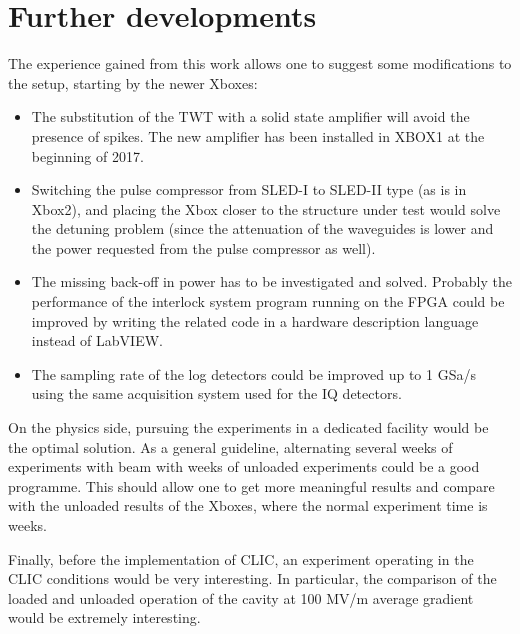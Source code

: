 \section[Further developments]{Further developments}

The experience gained from this work allows one to suggest some modifications to the setup, starting by the newer Xboxes:
\begin{itemize}
\item The substitution of the TWT with a solid state amplifier will avoid the presence of spikes. The new amplifier has been installed in XBOX1 at the beginning of 2017.
\item Switching the pulse compressor from SLED-I to SLED-II type (as is in Xbox2), and placing the Xbox closer to the structure under test would solve the detuning problem (since the attenuation of the waveguides is lower and the power requested from the pulse compressor as well).
\item The missing back-off in power has to be investigated and solved. Probably the performance of the interlock system program running on the FPGA could be improved by writing the related code in a hardware description language instead of LabVIEW.
\item The sampling rate of the log detectors could be improved up to 1 GSa/s using the same acquisition system used for the IQ detectors.
\end{itemize}

On the physics side, pursuing the experiments in a dedicated facility would be the optimal solution. As a general guideline, alternating several weeks of experiments with beam with weeks of unloaded experiments could be a good programme. This should allow one to get more meaningful results and compare with the unloaded results of the Xboxes, where the normal experiment time is weeks.

Finally, before the implementation of CLIC, an experiment operating in the CLIC conditions would be very interesting. In particular, the comparison of the loaded and unloaded operation of the cavity at 100 MV/m average gradient would be extremely interesting.